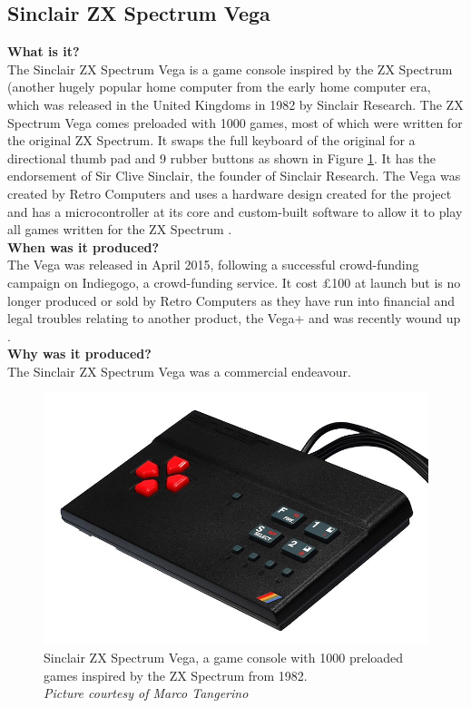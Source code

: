 \subsection{Sinclair ZX Spectrum Vega}
\textbf{What is it?}\\
The Sinclair ZX Spectrum Vega is a game console inspired by the ZX Spectrum (another hugely popular home computer from the early home computer era,  which was released in the United Kingdoms in 1982 by Sinclair Research. The ZX Spectrum Vega comes preloaded with 1000 games, most of which were written for the original ZX Spectrum. It swaps the full keyboard of the original for a directional thumb pad and 9 rubber buttons as shown in Figure \ref{Spectrum_Vega}. It has the endorsement of Sir Clive Sinclair, the founder of Sinclair Research. The Vega was created by Retro Computers and uses a hardware design created for the project and has a microcontroller at its core and custom-built software to allow it to play all games written for the ZX Spectrum 
\cite{RN119}.\\

\textbf{When was it produced?}\\
The Vega was released in April 2015, following a successful crowd-funding campaign on Indiegogo, a crowd-funding service. It cost \pounds 100  at launch but is no longer produced or sold by Retro Computers as they have run into financial and legal troubles relating to another product, the Vega+ and was recently wound up 
\cite{RN120}.  \\

\textbf{Why was it produced?}\\
The Sinclair ZX Spectrum Vega was a commercial endeavour. \\

\begin{figure} \begin{center}
\includegraphics[width=.3\linewidth]{pics/Spectrum_Vega} 
\end{center} 
\caption{Sinclair ZX Spectrum Vega, a game console with 1000 preloaded games inspired by the ZX Spectrum from 1982. \\ \textit{\small{Picture courtesy of Marco Tangerino}}}
\label{Spectrum_Vega}
\end{figure} 

